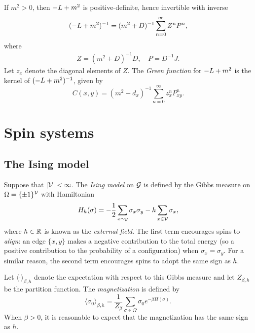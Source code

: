 If $m^2 > 0$, then $-L + m^2$ is positive-definite, hence invertible with inverse
\begin{equation}
(-L + m^2)^{-1} = (m^2 + D)^{-1} \sum_{n=0}^\infty Z^n P^n,
\end{equation}
where
\begin{align}
Z = (m^2 + D)^{-1} D,
  \quad
P = D^{-1} J.
\end{align}
Let $z_x$ denote the diagonal elements of $Z$. The \emph{Green function} for
$-L + m^2$ is the kernel of $(-L + m^2)^{-1}$, given by
\begin{equation}
C(x, y)
  =
(m^2 + d_x)^{-1} \sum_{n=0}^\infty z_x^n P^n_{xy}.
\end{equation}


\section{Spin systems}

\subsection{The Ising model}

Suppose that $|\mathcal{V}| < \infty$.
The \emph{Ising model} on $\mathcal{G}$ is defined by the Gibbs measure on $\Omega = \{ \pm 1 \}^{\mathcal{V}}$
with Hamiltonian
\begin{equation}
H_h(\sigma)
	=
-\frac{1}{2} \sum_{x \sim y} \sigma_x \sigma_y - h \sum_{x\in\mathcal{V}} \sigma_x,
\end{equation}
where $h \in {\mathbb R}$ is known as the \emph{external field}.
The first term encourages spins to \emph{align}: an edge $\{ x, y \}$ makes
a negative contribution to the total energy (so a positive contribution to
the probability of a configuration) when $\sigma_x = \sigma_y$.
For a similar reason, the second term encourages spins to adopt the same sign as $h$.

Let $\langle\cdot\rangle_{\beta,h}$ denote the expectation with respect to
this Gibbs measure and let $Z_{\beta,h}$ be the partition function.
The \emph{magnetization} is defined by
\begin{equation}
\langle \sigma_0 \rangle_{\beta,h} = \frac{1}{Z_\beta} \sum_{\sigma\in\Omega} \sigma_0 e^{-\beta H(\sigma)}.
\end{equation}
When $\beta > 0$, it is reasonable to expect that the magnetization has the
same sign as $h$.

